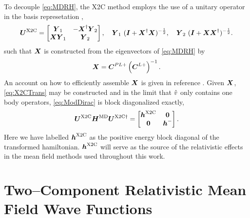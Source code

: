 To decouple \cref{eq:MDRH},
the X2C method employs the use of a unitary operator in the basis represetation ,
\begin{equation}
\label{eq:X2CTrans}
\boldsymbol{U}^{\mathrm{X2C}} = \begin{bmatrix} \boldsymbol{Y}_1 & - \boldsymbol{X}^\dagger \boldsymbol{Y}_2 \\ \boldsymbol{X} \boldsymbol{Y}_1 & \boldsymbol{Y}_2 \end{bmatrix},
\quad \boldsymbol{Y}_1 \ (\boldsymbol{I} + \boldsymbol{X}^\dagger \boldsymbol{X})^{-\frac{1}{2}},  
\quad \boldsymbol{Y}_2 \ (\boldsymbol{I} + \boldsymbol{X} \boldsymbol{X}^\dagger)^{-\frac{1}{2}}.  
\end{equation}
such that $\boldsymbol{X}$ is constructed from the eigenvectors of \cref{eq:MDRH} by
\begin{equation}
\boldsymbol{X} = \boldsymbol{C}^{PL+} \left(\boldsymbol{C}^{L+}\right)^{-1}.
\end{equation}
An account on how to efficiently assemble $\boldsymbol{X}$ is given in reference .
Given $\boldsymbol{X}$, \cref{eq:X2CTrans} may 
be constructed and in the limit that $\hat{v}$ only contains one body operators, \cref{eq:ModDirac} is block diagonalized 
exactly,
\begin{equation}
  \label{eq:X2CHam}
\boldsymbol{U}^{\mathrm{X2C}} \boldsymbol{H}^\mathrm{MD} \boldsymbol{U}^{\mathrm{X2C}\dagger} = \begin{bmatrix} \boldsymbol{h}^{\mathrm{X2C}} & \boldsymbol{0} \\ \boldsymbol{0} & \boldsymbol{h}^- \end{bmatrix}.
\end{equation}
Here we have labelled $\boldsymbol{h}^{\mathrm{X2C}}$ as the positive energy block diagonal of the transformed hamiltonian. $\boldsymbol{h}^{\mathrm{X2C}}$ 
will serve as the source of the relativistic effects in the mean field methods used throughout this work.










\section{Two--Component Relativistic Mean Field Wave Functions}
\label{sec:MF2C}


